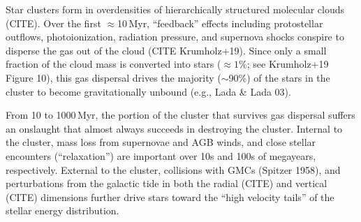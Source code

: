 \documentclass[12pt,twocolumn,tighten]{aastex63}
\begin{document}
Star clusters form in overdensities of hierarchically structured
molecular clouds (CITE).  Over the first $\approx$10\,Myr,
``feedback'' effects including protostellar outflows, photoionization,
radiation pressure, and supernova shocks conspire to disperse the gas
out of the cloud (CITE Krumholz+19).  Since only a small fraction of
the cloud mass is converted into stars ($\approx 1\%$; see Krumholz+19
Figure 10), this gas dispersal drives the majority ($\sim$90\%) of the
stars in the cluster to become gravitationally unbound (e.g., Lada \&
Lada 03).

From 10 to 1000\,Myr, the portion of the cluster that survives gas
dispersal suffers an onslaught that almost always succeeds in
destroying the cluster.  Internal to the cluster, mass loss from
supernovae and AGB winds, and close stellar encounters
(``relaxation'') are important over 10s and 100s of megayears,
respectively.  External to the cluster, collisions with GMCs (Spitzer
1958), and perturbations from the galactic tide in both the radial
(CITE) and vertical (CITE) dimensions further drive stars toward the
``high velocity tails'' of the stellar energy distribution.


% 
\end{document}
